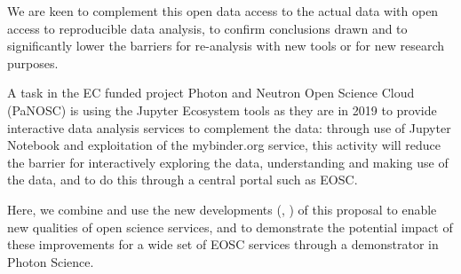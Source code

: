   We are keen to complement this open data access to the actual data
  with open access to reproducible data analysis, to confirm
  conclusions drawn and to significantly lower the barriers for
  re-analysis with new tools or for new research purposes.

  A task in the EC funded project Photon and Neutron Open Science
  Cloud (PaNOSC) is using the Jupyter Ecosystem tools as they are in
  2019 to provide interactive data analysis services to complement the
  data: through use of Jupyter Notebook and exploitation of the
  mybinder.org service, this activity will reduce the barrier for
  interactively exploring the data, understanding and making use of
  the data, and to do this through a central portal such as EOSC.

  Here, we combine and use the new developments (,
  ) of this
  proposal to enable new qualities of open science services, and to
  demonstrate the potential impact of these improvements for a wide
  set of EOSC services through a demonstrator in Photon Science.

  \medskip

